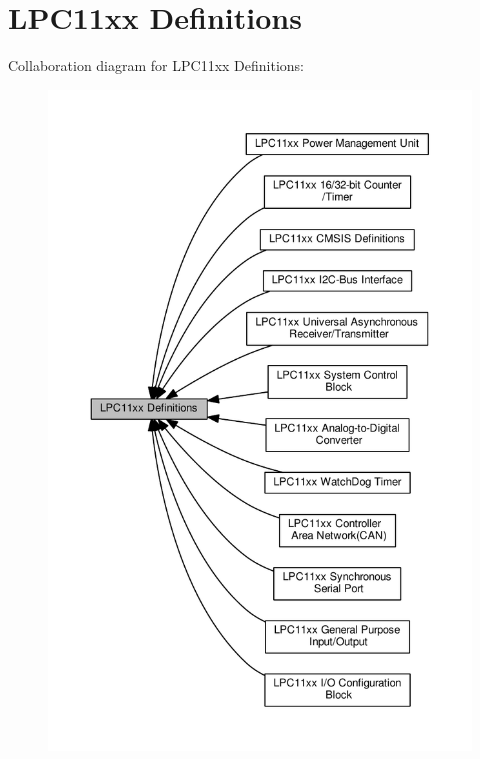 \hypertarget{group___l_p_c11xx___definitions}{}\section{L\+P\+C11xx Definitions}
\label{group___l_p_c11xx___definitions}
Collaboration diagram for L\+P\+C11xx Definitions\+:\nopagebreak
\begin{figure}[H]
\begin{center}
\leavevmode
\includegraphics[width=350pt]{group___l_p_c11xx___definitions}
\end{center}
\end{figure}
